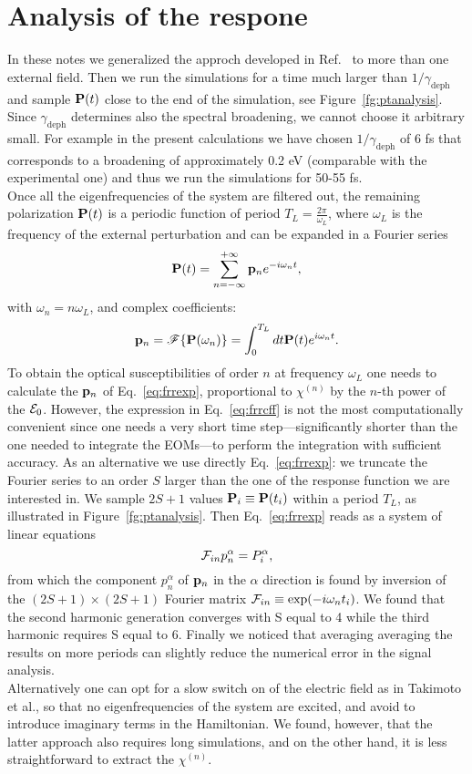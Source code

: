 \documentclass[submission, Phys]{SciPost}
\newcommand{\pp}{{\bf p}}
\newcommand{\PP}{{\bf P}}
\newcommand{\be}{\begin{equation}}
\newcommand{\ee}{\end{equation}}
\renewcommand{\[}{\left[}
\renewcommand{\]}{\right]}
\renewcommand{\(}{\left(}
\renewcommand{\)}{\right)}
\def\efield{\mathbf{\cal E}}
\def\susc#1{\chi^{(#1)}}
\begin{document}
\section{Analysis of the respone}
In these notes we generalized the approch developed in Ref.~\cite{Attaccalite2013,} to more than one external field.
 Then we run the simulations for a time much larger than $1/\gamma_{\text{deph}}$ and sample $\PP(t)$ close to the end of the simulation, see Figure~\ref{fg:ptanalysis}.
Since $\gamma_{\text{deph}}$ determines also the spectral broadening, we cannot choose it arbitrary small. For example in the present calculations we have chosen $1/\gamma_{\text{deph}}$ of 6 fs that corresponds to a broadening of approximately 0.2 eV (comparable with the experimental one) and thus we run the simulations for 50-55 fs.\\
Once all the eigenfrequencies of the system are filtered out, the remaining polarization $\PP(t)$ is a periodic function of period $T_L =\frac{2\pi}{\omega_L}$, where $\omega_L$ is the frequency of the external perturbation and can be expanded in a Fourier series
\be\label{eq:frrexp}
\PP(t) = \sum_{n=-\infty}^{+\infty} \pp_n e^{-i\omega_n t},
\ee  
with $\omega_n = n \omega_L$, and complex coefficients:
\begin{equation}\label{eq:frrcff}
 \pp_n  = \mathscr{F}\{\PP(\omega_n)\} =\int_{0}^{T_L} dt \PP(t) e^{i\omega_n t}.
\end{equation}
To obtain the optical susceptibilities of order $n$ at frequency $\omega_L$ one needs to calculate the $\pp_n$ of Eq.~\eqref{eq:frrexp}, proportional to $\susc n$ by the $n$-th power of the $\efield_0$. 
However, the expression in Eq.~\eqref{eq:frrcff} is not the most computationally convenient since one needs a very short time step---significantly shorter than the one needed to integrate the EOMs---to perform the integration with sufficient accuracy. As an alternative we use directly Eq.~\eqref{eq:frrexp}: we truncate the Fourier series to an order $S$ larger than the one of the response function we are interested in. We sample $2S+1$ values $\PP_i\equiv\PP(t_i)$ within a period $T_L$, as illustrated in Figure~\ref{fg:ptanalysis}. Then Eq.~\eqref{eq:frrexp} reads as a system of linear equations 
\be
{\cal F}_{in} p^\alpha_n = P^\alpha_i,
\label{eq:fouinv}
\ee 
from which the component $p^\alpha_n$ of $\pp_n$ in the $\alpha$ direction is found by inversion of the $(2S+1)\times(2S+1)$ Fourier matrix ${\cal F}_{in} \equiv \exp(-i\omega_n t_i)$. We found that the second harmonic generation converges with S equal to 4 while the third harmonic requires S equal to 6. Finally we noticed that averaging averaging the results on more periods can slightly reduce the numerical error in the signal analysis. \\
Alternatively one can opt for a slow switch on of the electric field as in Takimoto et al.,\cite{takimoto:154114} so that no eigenfrequencies of the system are excited, and avoid to introduce imaginary terms in the Hamiltonian. We found, however, that the latter approach also requires long simulations, and on the other hand, it is less straightforward to extract the $\susc n$.
\end{document}
